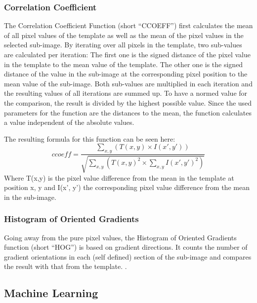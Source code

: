 \subsubsection{Correlation Coefficient}
The Correlation Coefficient Function (short ``CCOEFF'') first calculates the mean of all pixel values of the template as well as the mean of the pixel values in the selected sub-image.
By iterating over all pixels in the template, two sub-values are calculated per iteration:
The first one is the signed distance of the pixel value in the template to the mean value of the template.
The other one is the signed distance of the value in the sub-image at the corresponding pixel position to the mean value of the sub-image.
Both sub-values are multiplied in each iteration and the resulting values of all iterations are summed up.
To have a normed value for the comparison, the result is divided by the highest possible value.
Since the used parameters for the function are the distances to the mean, the function calculates a value independent of the absolute values.

The resulting formula for this function can be seen here:
\[ccoeff = \frac{\sum_{x,y} (T(x,y) \times I(x',y'))}{\sqrt{\sum_{x,y} (T(x,y)^2 \times \sum_{x,y} I(x',y')^2)}} \]
Where T(x,y) is the pixel value difference from the mean in the template at position x, y and I(x', y') the corresponding pixel value difference from the mean in the sub-image.

\subsubsection{Histogram of Oriented Gradients}
Going away from the pure pixel values, the Histogram of Oriented Gradients function (short ``HOG'') is based on gradient directions.
It counts the number of gradient orientations in each (self defined) section of the sub-image and compares the result with that from the template.
\cite{hog_function}.

\subsection{Machine Learning}

